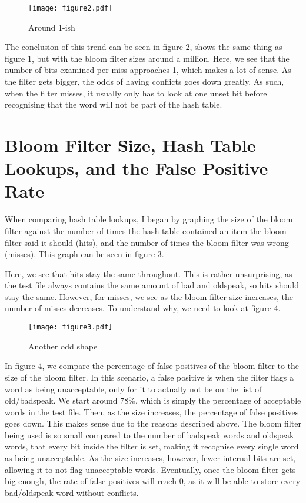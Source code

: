 \documentclass[11pt]{article}
\begin{document}
\begin{figure}[tbp]
\begin{centering}
\texttt{[image: figure2.pdf]}
\caption{Around 1-ish}
\end{centering}
\end{figure}

The conclusion of this trend can be seen in figure 2, shows the same thing as figure 1, but with the bloom filter sizes around a million. Here, we see that the number of bits examined per miss approaches 1, which makes a lot of sense. As the filter gets bigger, the odds of having conflicts goes down greatly. As such, when the filter misses, it usually only has to look at one unset bit before recognising that the word will not be part of the hash table.

\section{Bloom Filter Size, Hash Table Lookups, and the False Positive Rate}

When comparing hash table lookups, I began by graphing the size of the bloom filter against the number of times the hash table contained an item the bloom filter said it should (hits), and the number of times the bloom filter was wrong (misses). This graph can be seen in figure 3.

Here, we see that hits stay the same throughout. This is rather unsurprising, as the test file always contains the same amount of bad and oldspeak, so hits should stay the same. However, for misses, we see as the bloom filter size increases, the number of misses decreases. To understand why, we need to look at figure 4.

\begin{figure}[tbp]
\begin{centering}
\texttt{[image: figure3.pdf]}
\caption{Another odd shape}
\end{centering}
\end{figure}

In figure 4, we compare the percentage of false positives of the bloom filter to the size of the bloom filter. In this scenario, a false positive is when the filter flags a word as being unacceptable, only for it to actually not be on the list of old/badspeak. We start around 78\%, which is simply the percentage of acceptable words in the test file. Then, as the size increases, the percentage of false positives goes down. This makes sense due to the reasons described above. The bloom filter being used is so small compared to the number of badspeak words and oldspeak words, that every bit inside the filter is set, making it recognise every single word as being unacceptable. As the size increases, however, fewer internal bits are set, allowing it to not flag unacceptable words. Eventually, once the bloom filter gets big enough, the rate of false positives will reach 0, as it will be able to store every bad/oldspeak word without conflicts.
\end{document}
